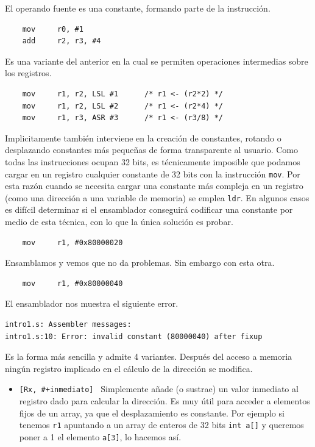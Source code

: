 \begin{descript}
  \item[Direccionamiento inmediato.]
    El operando fuente es una constante, formando parte de la instrucción.
\begin{lstlisting}
    mov     r0, #1
    add     r2, r3, #4
\end{lstlisting}
  \item[Direccionamiento inmediato con desplazamiento o rotación.]
    Es una variante del anterior en la cual se permiten operaciones intermedias
    sobre los registros.
\begin{lstlisting}
    mov     r1, r2, LSL #1      /* r1 <- (r2*2) */
    mov     r1, r2, LSL #2      /* r1 <- (r2*4) */
    mov     r1, r3, ASR #3      /* r1 <- (r3/8) */
\end{lstlisting}
    Implicitamente también interviene en la creación de constantes, rotando o
    desplazando constantes más pequeñas de forma transparente al usuario. Como todas
    las instrucciones ocupan 32 bits, es técnicamente imposible que podamos cargar
    en un registro cualquier constante de 32 bits con la instrucción {\tt mov}. Por
    esta razón cuando se necesita cargar una constante más compleja en un registro
    (como una dirección a una variable de memoria) se emplea {\tt ldr}. En algunos
    casos es difícil determinar si el ensamblador conseguirá codificar una constante
    por medio de esta técnica, con lo que la única solución es probar.
\begin{lstlisting}
    mov     r1, #0x80000020
\end{lstlisting}
    Ensamblamos y vemos que no da problemas. Sin embargo con esta otra.
\begin{lstlisting}
    mov     r1, #0x80000040
\end{lstlisting}
    El ensamblador nos muestra el siguiente error.
\begin{lstlisting}
intro1.s: Assembler messages:
intro1.s:10: Error: invalid constant (80000040) after fixup
\end{lstlisting}

  \item[Direccionamiento a memoria, sin actualizar registro puntero.]
    Es la forma más sencilla y admite 4 variantes. Después del acceso
    a memoria ningún registro implicado en el cálculo de la dirección
    se modifica.
\begin{itemize}
  \item{\tt [Rx, \#+inmediato] \newline
            [Rx, \#-inmediato] \newline}
    Simplemente añade (o sustrae) un valor inmediato al registro dado
    para calcular la dirección. Es muy útil para acceder a elementos
    fijos de un array, ya que el desplazamiento es constante. Por
    ejemplo si tenemos {\tt r1} apuntando a un array de enteros de
    32 bits {\tt int a[]} y queremos poner a 1 el
    elemento {\tt a[3]}, lo hacemos así.


\end{itemize}
\end{descript}
